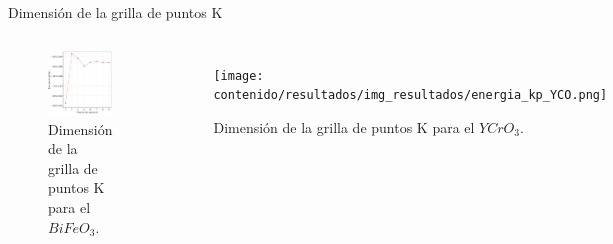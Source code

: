 \begin{frame}{Dimensi\'on de la grilla de puntos K}
        \begin{columns}[t]
\begin{figure}[H]
    \centering
    \includegraphics[width=1.0\textwidth]{contenido/resultados/img_resultados/energia_kp_BFO.png}
    \caption{Dimensi\'on de la grilla de puntos K para el $BiFeO_{3}$.}
\end{figure}
\begin{figure}[H]
    \centering
    \texttt{[image: contenido/resultados/img\_resultados/energia\_kp\_YCO.png]}
    \caption{Dimensi\'on de la grilla de puntos K para el $YCrO_{3}$.}
\end{figure}
        \end{columns}
\end{frame}
